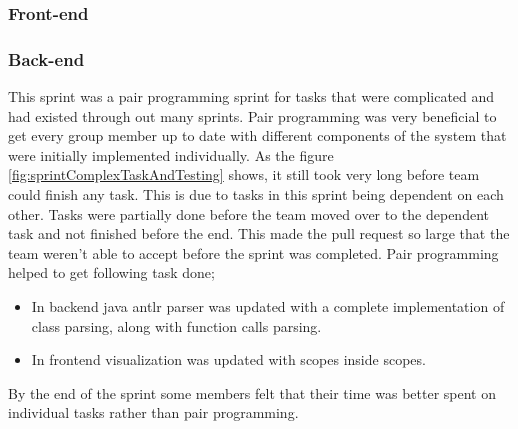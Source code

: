 \subsubsection{Front-end}

\subsubsection{Back-end}

This \gls{sprint} was a pair programming \gls{sprint} for tasks that were complicated and had existed through out many \glspl{sprint}. Pair programming was very beneficial to get every group member up to date with different components of the system that were initially implemented individually.
As the figure \ref{fig:sprintComplexTaskAndTesting} shows, it still took very long before team could finish any task. This is due to tasks in this \gls{sprint} being dependent on each other. Tasks were partially done before the team moved over to the dependent task and not finished before the end.
This made the pull request so large that the team weren't able to accept before the \gls{sprint} was completed.
Pair programming helped to get following task done;
\begin{itemize}
    \item In \gls{backend} java \gls{antlr} parser was updated with a complete implementation of class parsing, along with function calls parsing. 
    \item In \gls{frontend} visualization was updated with scopes inside scopes.
\end{itemize}

By the end of the \gls{sprint} some members felt that their time was better spent on individual tasks rather than pair programming.